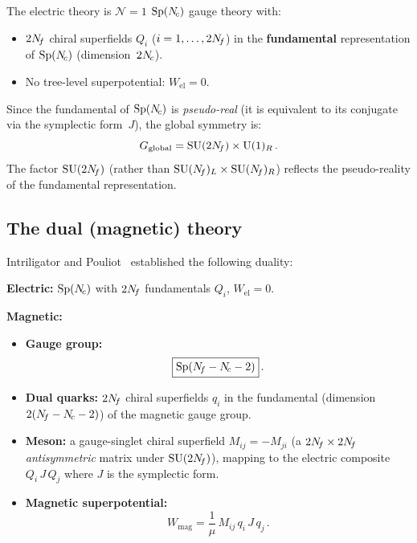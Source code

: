 \documentclass[11pt,a4paper]{article}
\newcommand{\Sp}[1]{\mathrm{Sp}(#1)}
\begin{document}
The electric theory is $\mathcal{N}=1$ $\Sp{\Nc}$ gauge theory with:
\begin{itemize}
  \item $2N_{\!f}$ chiral superfields $Q_i$ ($i = 1, \ldots, 2N_{\!f}$)
    in the \textbf{fundamental} representation of $\Sp{\Nc}$
    (dimension~$2N_{\!c}$).
  \item No tree-level superpotential: $W_{\text{el}} = 0$.
\end{itemize}

Since the fundamental of $\Sp{\Nc}$ is \emph{pseudo-real} (it is
equivalent to its conjugate via the symplectic form~$J$), the
global symmetry is:
\[
  G_{\text{global}} = \mathrm{SU}(2N_{\!f}) \times \mathrm{U}(1)_R\,.
\]
The factor $\mathrm{SU}(2N_{\!f})$ (rather than $\mathrm{SU}(N_{\!f})_L \times \mathrm{SU}(N_{\!f})_R$)
reflects the pseudo-reality of the fundamental representation.

\subsection{The dual (magnetic) theory}

Intriligator and Pouliot~\cite{IP9505006} established the following
duality:

\begin{tcolorbox}[
  enhanced,
  colback=blue!5!white,
  colframe=blue!70!black,
  fonttitle=\bfseries\large,
  title={Intriligator--Pouliot Duality for $\Sp{\Nc}$},
  breakable
]
\textbf{Electric:} $\Sp{\Nc}$ with $2N_{\!f}$ fundamentals $Q_i$,
\quad $W_{\text{el}} = 0$.

\medskip

\textbf{Magnetic:}
\begin{itemize}
  \item \textbf{Gauge group:}
    \begin{equation}\label{eq:Sp-dual}
      \boxed{\Sp{\Nf - \Nc - 2}}\,.
    \end{equation}
  \item \textbf{Dual quarks:} $2N_{\!f}$ chiral superfields $q_i$ in the
    fundamental (dimension $2(N_{\!f} - N_{\!c} - 2)$) of the magnetic
    gauge group.
  \item \textbf{Meson:} a gauge-singlet chiral superfield
    $M_{ij} = -M_{ji}$ (a $2N_{\!f} \times 2N_{\!f}$ \emph{antisymmetric}
    matrix under $\mathrm{SU}(2N_{\!f})$), mapping to the electric composite
    $Q_i\, J\, Q_j$ where $J$ is the symplectic form.
  \item \textbf{Magnetic superpotential:}
    \begin{equation}\label{eq:Sp-Wmag}
      W_{\text{mag}} = \frac{1}{\mu}\, M_{ij}\, q_i\, J\, q_j\,.
    \end{equation}
\end{itemize}
\end{tcolorbox}
\end{document}
